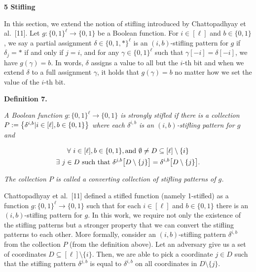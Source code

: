 \par\medskip\noindent\textbf{
5 Stifling}\par




In this section, we extend the notion of stifling introduced by Chattopadhyay et al. [11].
Let $g:\{0,1\}^{\ell}\to\{0,1\}$ be a Boolean function.
For $i\in[\ell]$ and $b\in\{0,1\}$, we say a partial assignment $\delta\in\{0,1,*\}^{\ell}$ is an $(i,b)$-stifling pattern for $g$ if $\delta_{j}=*$ if and only if $j=i$, and for any $\gamma\in\{0,1\}^{\ell}$ such that $\gamma[-i]=\delta[-i]$, we have $g(\gamma)=b$.
In words, $\delta$ assigns a value to all but the $i$-th bit and when we extend $\delta$ to a full assignment $\gamma$, it holds that $g(\gamma)=b$ no matter how we set the value of the $i$-th bit.\par





\par\medskip\noindent\textbf{
\textbf{Definition 7}\textbf{.}
}\par



\emph{A Boolean function $g:\{0,1\}^{\ell}\to\{0,1\}$ is strongly stifled if there is a collection $P:=\bigl{\{}\delta^{i,b}|i\in[\ell],b\in\{0,1\}\bigr{\}}$ where each $\delta^{i,b}$ is an $(i,b)$-stifling pattern for $g$ and}\par


\[\begin{gathered}
\displaystyle\forall\nobreak\ i\in[\ell],b\in\{0,1\},\text{and }%
\emptyset\neq D\subseteq[\ell]\setminus\{i\} \\
\displaystyle\exists\nobreak\ j\in D\text{ such that }\delta^{j,b}%
\bigl{[}D\setminus\{j\}\bigr{]}=\delta^{i,b}\bigl{[}D\setminus\{j\}\bigr{]}.
\end{gathered}\]


\emph{The collection $P$ is called a converting collection of stifling patterns of $g$.}\par






Chattopadhyay et al. [11] defined a stifled function (namely 1-stifled) as a function $g:\{0,1\}^{\ell}\to\{0,1\}$ such that for each $i\in[\ell]$ and $b\in\{0,1\}$ there is an $(i,b)$-stifling pattern for $g$.
In this work, we require not only the existence of the stifling patterns but a stronger property that we can convert the stifling patterns to each other.
More formally, consider an $(i,b)$-stifling pattern $\delta^{i,b}$ from the collection $P$ (from the definition above).
Let an adversary give us a set of coordinates $D\subseteq[\ell]\setminus\{i\}$.
Then, we are able to pick a coordinate $j\in D$ such that the stifling pattern $\delta^{j,b}$ is equal to $\delta^{i,b}$ on all coordinates in $D\setminus\{j\}$.\par





